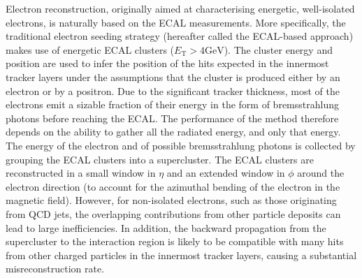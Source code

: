Electron reconstruction, originally aimed at characterising energetic, well-isolated electrons, is naturally based on the ECAL measurements. More specifically, the traditional electron seeding strategy (hereafter called the ECAL-based approach) \cite{2015} makes use of energetic ECAL clusters ($E_{\mathrm{T}}>4 \mathrm{GeV}$).  The cluster energy and position are used to infer the position of the hits expected in the innermost tracker layers under the assumptions that the cluster is produced either by an electron or by a positron.  Due to the significant tracker thickness, most of the electrons emit a sizable fraction of their energy in the form of bremsstrahlung photons before reaching the ECAL. The performance of the method therefore depends on the ability to gather all the radiated energy, and only that energy.  The energy of the electron and of possible bremsstrahlung photons is collected by grouping the ECAL clusters into a supercluster. The ECAL clusters are reconstructed in a small window in $\eta$ and an extended window in $\phi$ around the electron direction (to account for the azimuthal bending of the electron in the magnetic field). However, for non-isolated electrons, such as those originating from QCD jets, the overlapping contributions from other particle deposits can lead to large inefficiencies. In addition, the backward propagation from the supercluster to the interaction region is likely to be compatible with many hits from other charged particles in the innermost tracker layers, causing a substantial misreconstruction rate.

